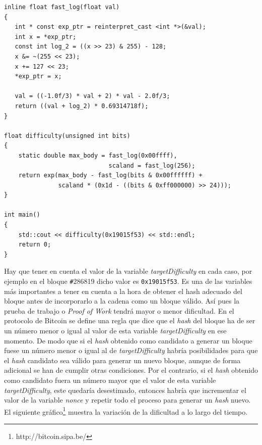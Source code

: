 \documentclass{article}
\begin{document}
\begin{enumerate}
\begin{verbatim}
inline float fast_log(float val)
{
   int * const exp_ptr = reinterpret_cast <int *>(&val);
   int x = *exp_ptr;
   const int log_2 = ((x >> 23) & 255) - 128;
   x &= ~(255 << 23);
   x += 127 << 23;
   *exp_ptr = x;

   val = ((-1.0f/3) * val + 2) * val - 2.0f/3;
   return ((val + log_2) * 0.69314718f);
}

float difficulty(unsigned int bits)
{
    static double max_body = fast_log(0x00ffff),
                             scaland = fast_log(256);
    return exp(max_body - fast_log(bits & 0x00ffffff) +
               scaland * (0x1d - ((bits & 0xff000000) >> 24)));
}

int main()
{
    std::cout << difficulty(0x19015f53) << std::endl;
    return 0;
}
        \end{verbatim}
        
        Hay que tener en cuenta el valor de la variable \textit{targetDifficulty} en cada caso, por ejemplo en el bloque \texttt{\#}286819 dicho valor es \texttt{0x19015f53}. Es una de las variables más importantes a tener en cuenta a la hora de obtener el hash adecuado del bloque antes de incorporarlo a la cadena como un bloque válido. Así pues la prueba de trabajo o \textit{Proof of Work} tendrá mayor o menor dificultad. En el protocolo de Bitcoin se define una regla que dice que el \textit{hash} del bloque ha de ser un número menor o igual al valor de esta variable \textit{targetDifficulty} en ese momento. De modo que si el \textit{hash} obtenido como candidato a generar un bloque fuese un número menor o igual al de \textit{targetDifficulty} habría posibilidades para que el \textit{hash} candidato sea válido para generar un nuevo bloque, aunque de forma adicional se han de cumplir otras condiciones. Por el contrario, si el \textit{hash} obtenido como candidato fuera un número mayor que el valor de esta variable \textit{targetDifficulty}, este quedaría desestimado, entonces habría que incrementar el valor de la variable \textit{nonce} y repetir todo el proceso para generar un \textit{hash} nuevo. El siguiente gráfico\footnote{http://bitcoin.sipa.be/} muestra la variación de la dificultad a lo largo del tiempo.
        

\end{enumerate}
\end{document}
